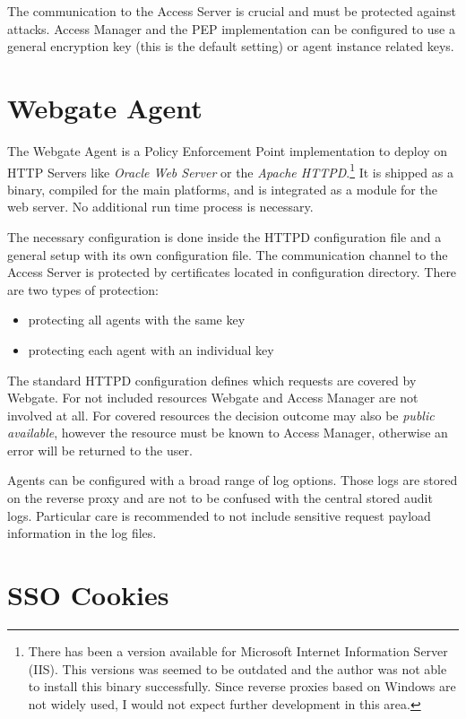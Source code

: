 The communication to the Access Server is crucial and must be protected
against attacks. Access Manager and the PEP implementation can be
configured to use a general encryption key (this is the default setting)
or agent instance related keys.


\section{Webgate Agent}

The Webgate Agent is a Policy Enforcement Point implementation to deploy
on HTTP Servers like \emph{Oracle Web Server} or the \emph{Apache
HTTPD}.\footnote{There has been a version available for Microsoft
    Internet Information Server (IIS). This versions was seemed to be outdated
    and the author was not able to install this binary successfully.
    Since reverse proxies based on Windows are not widely used, I would
not expect further development in this area.} It is shipped as a binary,
compiled for the main platforms, and is integrated as a module for the
web server. No additional run time process is necessary.

The necessary configuration is done inside the HTTPD configuration file
and a general setup with its own configuration file. The communication
channel to the Access Server is protected by certificates located in
configuration directory. There are two types of protection:

\begin{itemize}
    \item protecting all agents with the same key
    \item protecting each agent with an individual key
\end{itemize}

The standard HTTPD configuration defines which requests are covered by
Webgate.  For not included resources Webgate and Access Manager are not
involved at all.  For covered resources the decision outcome may also be
\emph{public available}, however the resource must be known to Access
Manager, otherwise an error will be returned to the user.

Agents can be configured with a broad range of log options. Those logs
are stored on the reverse proxy and are not to be confused with the
central stored audit logs. Particular care is recommended to not include 
sensitive request payload information in the log files.


\section{SSO Cookies}

